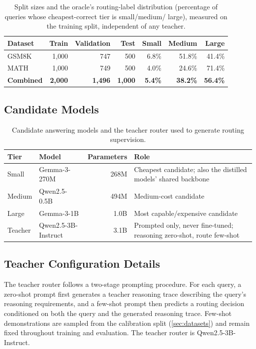 \documentclass{article}
\begin{document}
\begin{table}[h]
\centering
\caption{Split sizes and the oracle's routing-label distribution
(percentage of queries whose cheapest-correct tier is small/medium/
large), measured on the training split, independent of any teacher.}
\label{tab:splits}
\begin{tabular}{@{}lrrrrrr@{}}
\toprule
Dataset & Train & Validation & Test & Small & Medium & Large \\
\midrule
GSM8K & 1,000 & 747 & 500 & 6.8\% & 51.8\% & 41.4\% \\
MATH & 1,000 & 749 & 500 & 4.0\% & 24.6\% & 71.4\% \\
\textbf{Combined} & \textbf{2,000} & \textbf{1,496} & \textbf{1,000} & \textbf{5.4\%} & \textbf{38.2\%} & \textbf{56.4\%} \\
\bottomrule
\end{tabular}
\end{table}

\subsection{Candidate Models}
\label{sec:models-appendix}

\begin{table}[h]
\centering
\caption{Candidate answering models and the teacher router used to generate routing supervision.}
\label{tab:models}
\begin{tabular}{@{}llrp{6cm}@{}}
\toprule
Tier & Model & Parameters & Role \\
\midrule
Small & Gemma-3-270M & 268M & Cheapest candidate; also the distilled models' shared backbone \\
Medium & Qwen2.5-0.5B & 494M & Medium-cost candidate \\
Large & Gemma-3-1B & 1.0B & Most capable/expensive candidate \\
Teacher & Qwen2.5-3B-Instruct & 3.1B & Prompted only, never fine-tuned; reasoning zero-shot, route few-shot \\
\bottomrule
\end{tabular}
\end{table}

\subsection{Teacher Configuration Details}
\label{sec:teacher-config-appendix}
\label{sec:teacher-policy}

The teacher router follows a two-stage prompting procedure. For each
query, a zero-shot prompt first generates a teacher reasoning trace
describing the query's reasoning requirements, and a few-shot prompt
then predicts a routing decision conditioned on both the query and
the generated reasoning trace. Few-shot demonstrations are sampled
from the calibration split (\ref{sec:datasets}) and remain fixed
throughout training and evaluation. The teacher router is
Qwen2.5-3B-Instruct.
\end{document}
